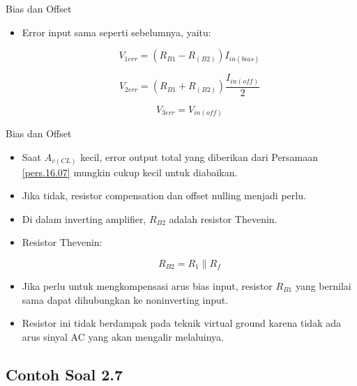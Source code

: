\begin{frame}{Bias dan Offset}
	\begin{itemize}
		\item Error input sama seperti sebelumnya, yaitu:
		
		\begin{equation}\label{pers.16.08}
			V_{1err} = (R_{B1} - R_{(B2)}) I_{in(bias)}
		\end{equation}
	
		\begin{equation}\label{pers.16.09}
			V_{2err} = (R_{B1} + R_{(B2)}) \frac{I_{in(off)}}{2}
		\end{equation}
	
		\begin{equation}\label{pers.16.10}
			V_{3err} = V_{in(off)}
		\end{equation}
	
	\end{itemize}
\end{frame}

\begin{frame}{Bias dan Offset}
	\begin{itemize}
		\item Saat $ A_{v(CL)} $ kecil, error output total yang diberikan dari Persamaan \ref{pers.16.07} mungkin cukup kecil untuk diabaikan.
		\item Jika tidak, resistor compensation dan offset nulling menjadi perlu.
		\item Di dalam inverting amplifier, $ R_{B2} $ adalah resistor Thevenin.
		\item Resistor Thevenin:
		
		\begin{equation}\label{pers.16.11}
			R_{B2} = R_1 \parallel R_f
		\end{equation}

		\item Jika perlu untuk mengkompensasi arus bias input, resistor $ R_{B1} $ yang bernilai sama dapat dihubungkan ke noninverting input.
		\item Resistor ini tidak berdampak pada teknik virtual ground karena tidak ada arus sinyal AC yang akan mengalir melaluinya.
	\end{itemize}
\end{frame}



\subsection{Contoh Soal 2.7}

